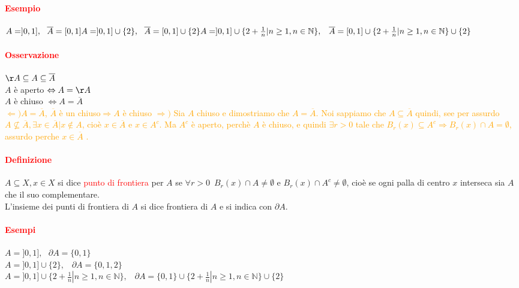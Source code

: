 \documentclass{article}
\newcommand{\N}{\mathbb{N}}
\begin{document}
\paragraph{\textcolor{red}{Esempio}}
$A=]0,1],\,\,\,\, \overline{A}=[0,1]\\
A=]0,1]\cup \{2\}, \,\,\,\, \overline{A}=[0,1]\cup \{2\}\\
A=]0,1]\cup \{ 2+\frac{1}{n}|n \geq 1, n \in \N \}, \,\,\,\,\, \overline{A}=[0,1] \cup \{2+\frac{1}{n}|n \geq 1, n \in \N \} \cup \{2\}  $

\paragraph{\textcolor{red}{Osservazione}}
$\AA \subseteq A \subseteq \overline{A}$\\
$A $ è aperto $\Leftrightarrow A= \AA$\\
$A$ è chiuso $\Leftrightarrow A=\overline{A}$\\
\textcolor{orange}{$\Leftarrow) A=\overline{A}$, $\overline{A}$ è un chiuso$\Rightarrow A$ è chiuso $\Rightarrow)$ Sia $A$ chiuso e dimostriamo che $A=\overline{A}$. Noi sappiamo che $A \subseteq \overline{A}$ quindi, see per assurdo $A \nsubseteq \overline{A}, \exists x \in \overline{A}| x \notin A$, cioè $x \in \overline{A}$ e $x \in A^c$. Ma $ A^c $ è aperto, perchè $ A $ è chiuso, e quindi $ \exists r >0 $ tale che $ B_r (x) \subseteq A^c \Rightarrow B_r (x) \cap A = \emptyset$, assurdo perche $x \in \overline{A}$ .}

\paragraph{\textcolor{red}{Definizione}}
$A \subseteq X, x \in X$ si dice \textcolor{red}{punto di frontiera} per $A$ se $\forall r>0 \,\,\, B_r(x) \cap A \neq \emptyset$ e $B_r(x) \cap A^c \neq \emptyset$, cioè se ogni palla di centro $x$ interseca sia $A$ che il suo complementare.\\
L'insieme dei punti di frontiera di $A$ si dice frontiera di $A$ e si indica con $\partial A$. 

\paragraph{\textcolor{red}{Esempi}}
$A=]0,1],\,\,\,\, \partial A= \{0,1\}$\\
$A=]0,1]\cup\{2\},\,\,\,\,\, \partial A= \{0,1,2\}$\\
$A=]0,1]\cup \{ 2+\frac{1}{n}|n \geq 1, n \in \N \}, \,\,\,\,\, \partial A =\{0,1\}\cup \{2+\frac{1}{n}|n \geq 1, n \in \N \} \cup \{2\}$
\end{document}
